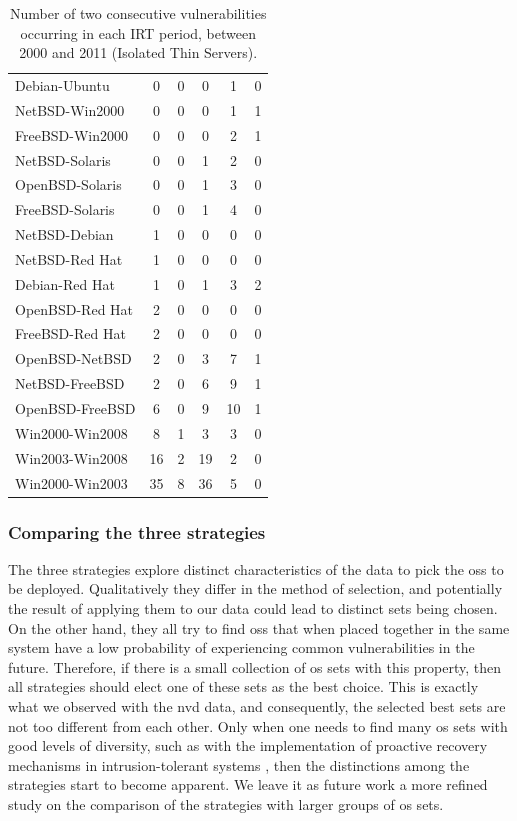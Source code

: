 \begin{table}[!ht]
\begin{center}
{\begin{tabular}{|l||c c c c c|}
Debian-Ubuntu & 0 & 0 & 0 & 1 & 0 \\
NetBSD-Win2000 & 0 & 0 & 0 & 1 & 1 \\
FreeBSD-Win2000 & 0 & 0 & 0 & 2 & 1 \\ \hline
NetBSD-Solaris & 0 & 0 & 1 & 2 & 0 \\
OpenBSD-Solaris & 0 & 0 & 1 & 3 & 0 \\
FreeBSD-Solaris & 0 & 0 & 1 & 4 & 0 \\ \hline
NetBSD-Debian & 1 & 0 & 0 & 0 & 0  \\
NetBSD-Red Hat & 1 & 0 & 0 & 0 & 0 \\
Debian-Red Hat & 1 & 0 & 1 & 3 & 2 \\
OpenBSD-Red Hat & 2 & 0 & 0 & 0 & 0 \\
FreeBSD-Red Hat & 2 & 0 & 0 & 0 & 0 \\
OpenBSD-NetBSD & 2 & 0 & 3 & 7 & 1 \\
NetBSD-FreeBSD & 2 & 0 & 6 & 9 & 1 \\
OpenBSD-FreeBSD & 6 & 0 & 9 & 10 &  1\\
Win2000-Win2008 & 8 & 1 & 3 & 3 & 0 \\
Win2003-Win2008 & 16 & 2 & 19 & 2 & 0 \\
Win2000-Win2003 & 35 & 8 & 36 & 5 & 0\\ \hline
\end{tabular}
\caption{Number of two consecutive vulnerabilities occurring in each IRT period, between 2000 and 2011 (Isolated Thin Servers).}
\label{tab:pairs_irt_iso}
}
\end{center}
\end{table}

\subsubsection*{Comparing the three strategies}
The three strategies explore distinct characteristics of the data to pick the \glspl{os} to be deployed. 
Qualitatively they differ in the method of selection, and potentially the result of applying them to our data could lead to distinct sets being chosen.
On the other hand, they all try to find \glspl{os} that when placed together in the same system have a low probability of experiencing common vulnerabilities in the future. 
Therefore, if there is a small collection of \gls{os} sets with this property, then all strategies should elect one of these sets as the best choice. 
This is exactly what we observed with the \gls{nvd} data, and consequently, the selected best sets are not too different from each other.
Only when one needs to find many \gls{os} sets with good levels of diversity, such as with the implementation of proactive recovery mechanisms in intrusion-tolerant systems \cite{Castro:2002,Sousa:2010}, then the distinctions among the strategies start to become apparent.
We leave it as future work a more refined study on the comparison of the strategies with larger groups of \gls{os} sets.

